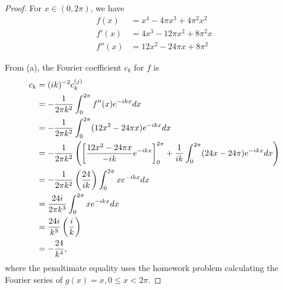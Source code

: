 \documentclass{article}
\begin{document}
\begin{enumerate}[(a)]
\begin{proof}
For $x \in (0, 2\pi)$, we have 
\begin{align*}
f(x) & = x^4 - 4 \pi x^3 + 4 \pi^2 x^2
\\ f'(x) & = 4x^3 - 12 \pi x^2 + 8 \pi^2 x
\\ f''(x) & = 12x^2 - 24 \pi x + 8 \pi^2 
\end{align*}

From (a), the Fourier coefficient $c_k$ for $f$ is
\begin{align*}
c_k & = (ik)^{-2} c_k^{(j)}
\\  & = -\frac 1 {2 \pi k^2} \int_0^{2\pi} f''(x) e^{-ikx} dx
\\  & = -\frac 1 {2 \pi k^2} \int_0^{2\pi} (12x^2 - 24 \pi x) e^{-ikx} dx
\\  & = -\frac {1} {2 \pi k^2}  \left( \left[ \frac{12x^2 - 24 \pi x}{-ik} e^{-ikx}\right]_0^{2\pi}  + \frac 1 {ik} \int_0^{2 \pi} (24x - 24 \pi)e^{-ikx} dx \right)
\\  & = -\frac {1} {2 \pi k^2}  \left( \frac {24} {ik} \right) \int_0^{2 \pi} xe^{-ikx} dx 
\\  & = \frac {24i} {2 \pi k^3} \int_0^{2\pi} x e^{-ikx} dx
\\  & = \frac {24i} {k^3} \left( \frac i k \right)
\\ & = - \frac{24} {k^4},
\end{align*}
where the penultimate equality uses the homework problem calculating the Fourier series of $g(x) = x, 0 \le x < 2 \pi$.
\end{proof}


\end{enumerate}
\end{document}
